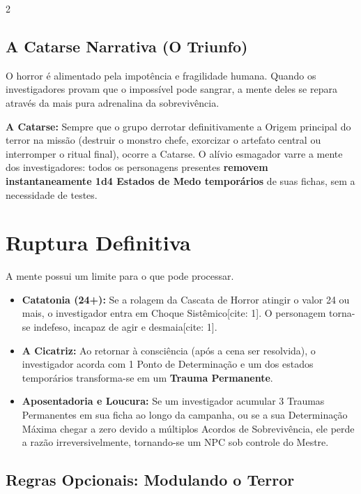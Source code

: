 \documentclass[a4paper,11pt,openany]{book}
\begin{document}
\begin{multicols}{2}
\subsection{A Catarse Narrativa (O Triunfo)}

O horror é alimentado pela impotência e fragilidade humana. Quando os investigadores provam que o impossível pode sangrar, a mente deles se repara através da mais pura adrenalina da sobrevivência.

\begin{regra}
\textbf{A Catarse:} Sempre que o grupo derrotar definitivamente a Origem principal do terror na missão (destruir o monstro chefe, exorcizar o artefato central ou interromper o ritual final), ocorre a Catarse. O alívio esmagador varre a mente dos investigadores: todos os personagens presentes \textbf{removem instantaneamente 1d4 Estados de Medo temporários} de suas fichas, sem a necessidade de testes.
\end{regra}

\section{Ruptura Definitiva}

A mente possui um limite para o que pode processar.

\begin{itemize}
    \item \textbf{Catatonia (24+):} Se a rolagem da Cascata de Horror atingir o valor 24 ou mais, o investigador entra em Choque Sistêmico[cite: 1]. O personagem torna-se indefeso, incapaz de agir e desmaia[cite: 1].
    \item \textbf{A Cicatriz:} Ao retornar à consciência (após a cena ser resolvida), o investigador acorda com 1 Ponto de Determinação e um dos estados temporários transforma-se em um \textbf{Trauma Permanente}.
    \item \textbf{Aposentadoria e Loucura:} Se um investigador acumular 3 Traumas Permanentes em sua ficha ao longo da campanha, ou se a sua Determinação Máxima chegar a zero devido a múltiplos Acordos de Sobrevivência, ele perde a razão irreversivelmente, tornando-se um NPC sob controle do Mestre.
\end{itemize}

\subsection*{Regras Opcionais: Modulando o Terror}


\end{multicols}
\end{document}
